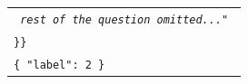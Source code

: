 \begin{table}[!th]
\begin{tabular}{>{\raggedright\arraybackslash\tt}p{}<{}}
{    %
    \textit{rest of the question omitted...}"
}\\
\}\}\newline%
\\
{\color{violet}\{
    "label": 2
\}}
\\
       \bottomrule
    \end{tabular}
\end{table}
